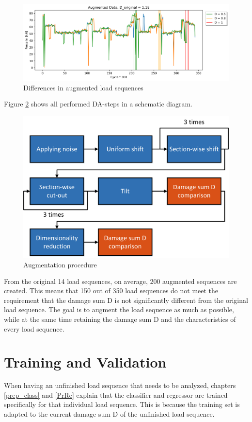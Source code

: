 \begin{figure}[H]
	\centering
	\includegraphics[width=1\linewidth]{IMGs/Augmented_5.png}
	\caption{Differences in augmented load sequences}
	\label{fig:3in1}
\end{figure}

Figure \ref{fig:allDA} shows all performed DA-steps in a schematic diagram.

\begin{figure}[H]
	\centering
	\includegraphics[width=0.7\linewidth]{IMGs/Augmentation.png}
	\caption{Augmentation procedure}
	\label{fig:allDA}
\end{figure}

From the original 14 load sequences, on average, 200 augmented sequences are created. This means that 150 out of 350 load sequences do not meet the requirement that the damage sum D is not significantly different from the original load sequence. 
The goal is to augment the load sequence as much as possible, while at the same time retaining the damage sum D and the characteristics of every load sequence. 
\newpage

\section{Training and Validation}
When having an unfinished load sequence that needs to be analyzed, chapters \ref{prep_class} and \ref{PrRe} explain that the classifier and regressor are trained specifically for that individual load sequence. This is because the training set is adapted to the current damage sum D of the unfinished load sequence.

